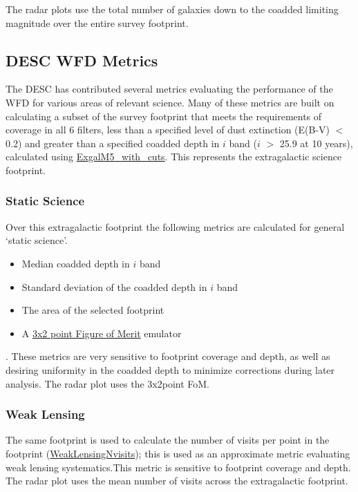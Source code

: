 The radar plots use the total number of galaxies down to the coadded limiting magnitude over the entire survey footprint.

\subsection{DESC WFD Metrics}

The DESC has contributed several metrics evaluating the performance of the WFD for various areas of relevant science. Many of these metrics are built on calculating a subset of the survey footprint that meets the requirements of coverage in all 6 filters, less than a specified level of dust extinction (E(B-V) $<$ 0.2) and greater than a specified coadded depth in $i$ band ($i$ $>$ 25.9 at 10 years), calculated using \href{https://github.com/lsst/sims_maf/blob/master/python/lsst/sims/maf/metrics/weakLensingSystematicsMetric.py#L8}{ExgalM5\_with\_cuts}. This represents the extragalactic science footprint. 

\subsubsection{Static Science}
Over this extragalactic footprint the following metrics are calculated for general `static science'.
\begin{itemize}
\item Median coadded depth in $i$ band
\item Standard deviation of the coadded depth in $i$ band
\item The area of the selected footprint
\item A \href{https://github.com/lsst/sims_maf/blob/master/python/lsst/sims/maf/metrics/summaryMetrics.py#L231}{3x2 point Figure of Merit} emulator
\end{itemize}. 
These metrics are very sensitive to footprint coverage and depth, as well as desiring uniformity in the coadded depth to minimize corrections during later analysis.
The radar plot uses the 3x2point FoM. 

\subsubsection{Weak Lensing}
The same footprint is used to calculate the number of visits per point in the footprint (\href{https://github.com/lsst/sims_maf/blob/master/python/lsst/sims/maf/metrics/weakLensingSystematicsMetric.py#L59}{WeakLensingNvisits}); this is used as an approximate metric evaluating weak lensing systematics.This metric is sensitive to footprint coverage and depth. 
The radar plot uses the mean number of visits across the extragalactic footprint. 

